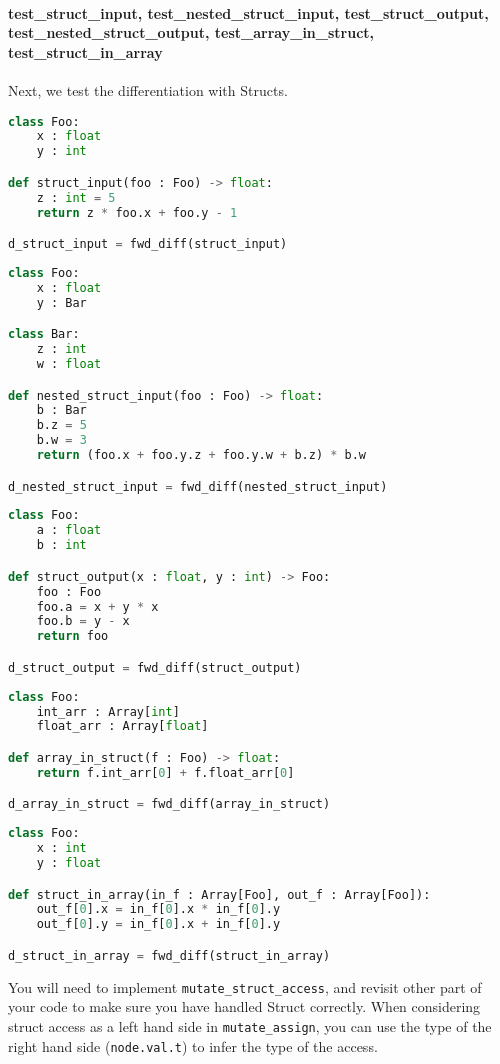 \paragraph{test_struct_input, test_nested_struct_input, test_struct_output, test_nested_struct_output, test_array_in_struct, test_struct_in_array} Next, we test the differentiation with Structs.
\begin{lstlisting}[language=Python]
class Foo:
    x : float
    y : int

def struct_input(foo : Foo) -> float:
    z : int = 5
    return z * foo.x + foo.y - 1

d_struct_input = fwd_diff(struct_input)
\end{lstlisting}
\begin{lstlisting}[language=Python]
class Foo:
    x : float
    y : Bar

class Bar:
    z : int
    w : float

def nested_struct_input(foo : Foo) -> float:
    b : Bar
    b.z = 5
    b.w = 3
    return (foo.x + foo.y.z + foo.y.w + b.z) * b.w

d_nested_struct_input = fwd_diff(nested_struct_input)
\end{lstlisting}
\begin{lstlisting}[language=Python]
class Foo:
    a : float
    b : int

def struct_output(x : float, y : int) -> Foo:
    foo : Foo
    foo.a = x + y * x
    foo.b = y - x
    return foo

d_struct_output = fwd_diff(struct_output)
\end{lstlisting}
\begin{lstlisting}[language=Python]
class Foo:
    int_arr : Array[int]
    float_arr : Array[float]

def array_in_struct(f : Foo) -> float:
    return f.int_arr[0] + f.float_arr[0]

d_array_in_struct = fwd_diff(array_in_struct)
\end{lstlisting}
\begin{lstlisting}[language=Python]
class Foo:
    x : int
    y : float

def struct_in_array(in_f : Array[Foo], out_f : Array[Foo]):
    out_f[0].x = in_f[0].x * in_f[0].y
    out_f[0].y = in_f[0].x + in_f[0].y

d_struct_in_array = fwd_diff(struct_in_array)
\end{lstlisting}
You will need to implement \lstinline{mutate_struct_access}, and revisit other part of your code to make sure you have handled Struct correctly. When considering struct access as a left hand side in \lstinline{mutate_assign}, you can use the type of the right hand side (\lstinline{node.val.t}) to infer the type of the access.

